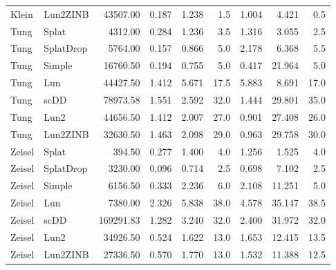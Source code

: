 \begin{table}
\begin{tabular}[t]{l l r r r r r r r}
Klein & Lun2ZINB & 43507.00 & 0.187 & 1.238 & 1.5 & 1.004 & 4.421 & 0.5\\
Tung & Splat & 4312.00 & 0.284 & 1.236 & 3.5 & 1.316 & 3.055 & 2.5\\
Tung & SplatDrop & 5764.00 & 0.157 & 0.866 & 5.0 & 2.178 & 6.368 & 5.5\\
Tung & Simple & 16760.50 & 0.194 & 0.755 & 5.0 & 0.417 & 21.964 & 5.0\\
Tung & Lun & 44427.50 & 1.412 & 5.671 & 17.5 & 5.883 & 8.691 & 17.0\\
Tung & scDD & 78973.58 & 1.551 & 2.592 & 32.0 & 1.444 & 29.801 & 35.0\\
Tung & Lun2 & 44656.50 & 1.412 & 2.007 & 27.0 & 0.901 & 27.408 & 26.0\\
Tung & Lun2ZINB & 32630.50 & 1.463 & 2.098 & 29.0 & 0.963 & 29.758 & 30.0\\
Zeisel & Splat & 394.50 & 0.277 & 1.400 & 4.0 & 1.256 & 1.525 & 4.0\\
Zeisel & SplatDrop & 3230.00 & 0.096 & 0.714 & 2.5 & 0.698 & 7.102 & 2.5\\
Zeisel & Simple & 6156.50 & 0.333 & 2.236 & 6.0 & 2.108 & 11.251 & 5.0\\
Zeisel & Lun & 7380.00 & 2.326 & 5.838 & 38.0 & 4.578 & 35.147 & 38.5\\
Zeisel & scDD & 169291.83 & 1.282 & 3.240 & 32.0 & 2.400 & 31.972 & 32.0\\
Zeisel & Lun2 & 34926.50 & 0.524 & 1.622 & 13.0 & 1.653 & 12.415 & 13.5\\
Zeisel & Lun2ZINB & 27336.50 & 0.570 & 1.770 & 13.0 & 1.532 & 11.388 & 12.5\\
\hline
\end{tabular}
\end{table}